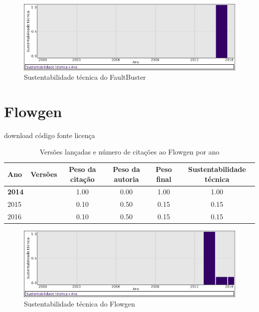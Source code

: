 \begin{figure}[h]
  \center
  \includegraphics[scale=0.50]{imagens/softwares-charts/faultbuster.png}
  \caption{Sustentabilidade técnica do FaultBuster}
\end{figure}


\section{Flowgen}
\checkmark download
\checkmark código fonte
\checkmark licença


\begin{table}[H]
\caption{Versões lançadas e número de citações ao Flowgen por ano}
\centering
\begin{tabular}{| l | c | c | c | c | c |}
  \hline
  Ano & Versões & Peso da citação & Peso da autoria & Peso final & Sustentabilidade técnica \\
  \hline
            {\bf 2014}
          &
          
          &
          1.00
          &
          0.00
          &
          1.00
          &
            {\color{blue} 1.00}
          \\
\hline
            2015
          &
          
          &
          0.10
          &
          0.50
          &
          0.15
          &
            {\color{red} 0.15}
          \\
\hline
            2016
          &
          
          &
          0.10
          &
          0.50
          &
          0.15
          &
            {\color{red} 0.15}
          \\
\hline
\end{tabular}
\end{table}

\begin{figure}[h]
  \center
  \includegraphics[scale=0.50]{imagens/softwares-charts/flowgen.png}
  \caption{Sustentabilidade técnica do Flowgen}
\end{figure}



